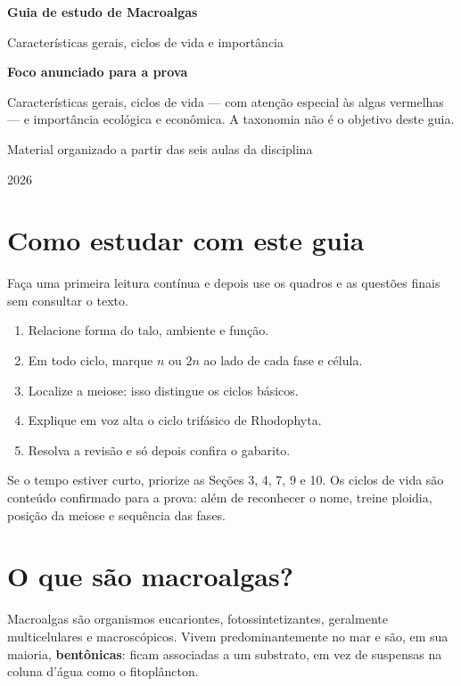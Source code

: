 \documentclass[12pt,a4paper]{article}
\newcommand{\n}{\ensuremath{n}}
\newcommand{\dn}{\ensuremath{2n}}
\begin{document}
\begin{titlepage}
\centering
\vspace*{2.2cm}
{\Huge\bfseries\color{azul} Guia de estudo de Macroalgas\par}
\vspace{0.5cm}
{\Large Características gerais, ciclos de vida e importância\par}
\vspace{1.6cm}
\begin{tcolorbox}[width=0.86\textwidth,colback=azulclaro,colframe=azul]
\centering
\textbf{Foco anunciado para a prova}

Características gerais, ciclos de vida --- com atenção especial às algas
vermelhas --- e importância ecológica e econômica. A taxonomia não é o
objetivo deste guia.
\end{tcolorbox}
\vfill
{\large Material organizado a partir das seis aulas da disciplina\par}
\vspace{0.5cm}
{\large 2026\par}
\end{titlepage}
\tableofcontents
\newpage

\section*{Como estudar com este guia}
Faça uma primeira leitura contínua e depois use os quadros e as questões finais
sem consultar o texto.
\begin{enumerate}
\item Relacione forma do talo, ambiente e função.
\item Em todo ciclo, marque \n{} ou \dn{} ao lado de cada fase e célula.
\item Localize a meiose: isso distingue os ciclos básicos.
\item Explique em voz alta o ciclo trifásico de Rhodophyta.
\item Resolva a revisão e só depois confira o gabarito.
\end{enumerate}
\begin{essencial}
Se o tempo estiver curto, priorize as Seções 3, 4, 7, 9 e 10. Os ciclos de
vida são conteúdo confirmado para a prova: além de reconhecer o nome, treine
ploidia, posição da meiose e sequência das fases.
\end{essencial}

\section{O que são macroalgas?}
Macroalgas são organismos eucariontes, fotossintetizantes, geralmente
multicelulares e macroscópicos. Vivem predominantemente no mar e são, em sua
maioria, \textbf{bentônicas}: ficam associadas a um substrato, em vez de
suspensas na coluna d'água como o fitoplâncton.
\end{document}

